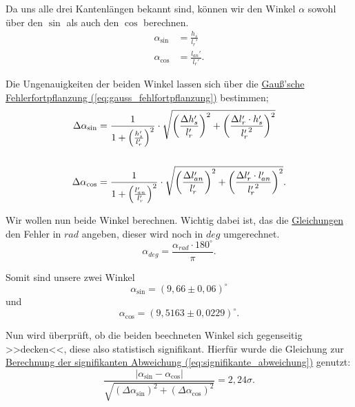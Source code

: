 Da uns alle drei Kantenlängen bekannt sind, können wir den Winkel $\alpha$ sowohl über den $\sin$ als auch den $\cos$ berechnen. 
\begin{align}
    \alpha_{\sin} &= \frac{h_s}{l_r'} \\
    \alpha_{\cos} &= \frac{l_{an}'}{l_r'}.
\end{align}

Die Ungenauigkeiten der beiden Winkel lassen sich über die \hyperref[eq:gauss_fehlfortpflanzung]{Gauß'sche Fehlerfortpflanzung (\ref*{eq:gauss_fehlfortpflanzung})} bestimmen;
\begin{align}
    \Delta \alpha_{\sin} &= \frac{1}{1+\left(\frac{h_s'}{l_r'}\right)^2} \cdot \sqrt{\left(\frac{\Delta h_s'}{l_r'}\right)^2 + \left(\frac{\Delta l_r' \cdot h_s'}{{l_{r}'}^2}\right)^2} \\
    \notag \\
    \Delta \alpha_{\cos} &= \frac{1}{1+\left(\frac{l_{an}'}{l_r'}\right)^2} \cdot \sqrt{\left(\frac{\Delta l_{an}'}{l_r'}\right)^2 + \left(\frac{\Delta l_r' \cdot l_{an}'}{{l_{r}'}^2}\right)^2}.
    \label{eq:fehler_alpha_cos}
\end{align}

Wir wollen nun beide Winkel berechnen. Wichtig dabei ist, das die \hyperref[eq:fehler_alpha_cos]{Gleichungen} den Fehler in $rad$ angeben, dieser wird noch in $deg$ umgerechnet.
\begin{equation}
    \alpha_{deg} = \frac{\alpha_{rad} \cdot 180^\circ}{\pi}.
\end{equation}

Somit sind unsere zwei Winkel
\begin{equation}
\boxed{
    \alpha_{\sin} = (9,66 \pm 0,06) ^\circ
}
\end{equation}
und
\begin{equation}
\boxed{
    \alpha_{\cos} = (9,5163 \pm 0,0229) ^\circ
    \label{eq:alpha_cos}
}.
\end{equation}

Nun wird überprüft, ob die beiden beechneten Winkel sich gegenseitig >>decken<<, diese also statistisch signifikant. Hierfür wurde die Gleichung zur \hyperref[eq:signifikante_abweichung]{Berechnung der signifikanten Abweichung (\ref*{eq:signifikante_abweichung})} genutzt:
\begin{equation}
    \frac{\left| \alpha_{\sin} - \alpha_{\cos} \right|}{\sqrt{(\Delta \alpha_{\sin})^2 + (\Delta \alpha_{\cos})^2}} = 2,24\sigma. 
\end{equation}

